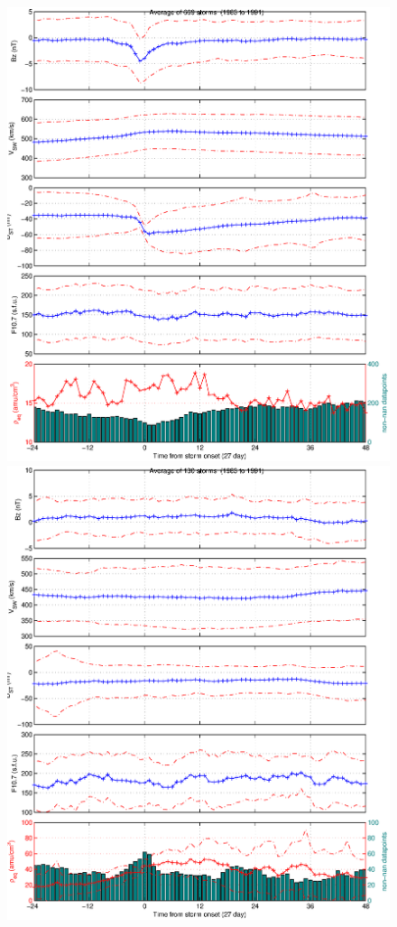 \documentclass[10pt,twocolumn]{article}
\begin{document}
\begin{figure}[htp!]
\centering
\includegraphics[scale=0.5]{paperfigures/stormavs-dst.eps}
\includegraphics[scale=0.5]{paperfigures/stormavs-mass.eps}

\end{figure}
\end{document}
